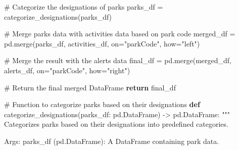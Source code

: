 \documentclass[
  letterpaper,
  DIV=11,
  numbers=noendperiod]{scrartcl}
\newenvironment{Shaded}{\begin{snugshade}}{\end{snugshade}}
\newcommand{\CommentTok}[1]{\textcolor[rgb]{0.37,0.37,0.37}{#1}}
\newcommand{\ControlFlowTok}[1]{\textcolor[rgb]{0.00,0.23,0.31}{\textbf{#1}}}
\newcommand{\KeywordTok}[1]{\textcolor[rgb]{0.00,0.23,0.31}{\textbf{#1}}}
\newcommand{\NormalTok}[1]{\textcolor[rgb]{0.00,0.23,0.31}{#1}}
\newcommand{\OperatorTok}[1]{\textcolor[rgb]{0.37,0.37,0.37}{#1}}
\newcommand{\StringTok}[1]{\textcolor[rgb]{0.13,0.47,0.30}{#1}}
\begin{document}
\begin{Shaded}
\begin{Highlighting}[]
    \CommentTok{\# Categorize the designations of parks}
\NormalTok{    parks\_df }\OperatorTok{=}\NormalTok{ categorize\_designations(parks\_df)}

    \CommentTok{\# Merge parks data with activities data based on park code}
\NormalTok{    merged\_df }\OperatorTok{=}\NormalTok{ pd.merge(parks\_df, activities\_df, on}\OperatorTok{=}\StringTok{"parkCode"}\NormalTok{, how}\OperatorTok{=}\StringTok{"left"}\NormalTok{)}

    \CommentTok{\# Merge the result with the alerts data}
\NormalTok{    final\_df }\OperatorTok{=}\NormalTok{ pd.merge(merged\_df, alerts\_df, on}\OperatorTok{=}\StringTok{"parkCode"}\NormalTok{, how}\OperatorTok{=}\StringTok{"right"}\NormalTok{)}

    \CommentTok{\# Return the final merged DataFrame}
    \ControlFlowTok{return}\NormalTok{ final\_df}

\CommentTok{\# Function to categorize parks based on their designations}
\KeywordTok{def}\NormalTok{ categorize\_designations(parks\_df: pd.DataFrame) }\OperatorTok{{-}\textgreater{}}\NormalTok{ pd.DataFrame:}
    \CommentTok{"""}
\CommentTok{    Categorizes parks based on their designations into predefined categories.}

\CommentTok{    Args:}
\CommentTok{        parks\_df (pd.DataFrame): A DataFrame containing park data.}


\end{Highlighting}
\end{Shaded}
\end{document}
